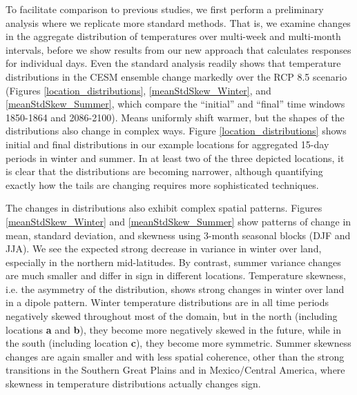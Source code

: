 \documentclass{ametsoc}
\begin{document}
To facilitate comparison to previous studies, we first perform a preliminary analysis where we replicate more standard methods. That is, we examine changes in the aggregate distribution of temperatures over multi-week and multi-month intervals, before we show results from our new approach that calculates responses for individual days. Even the standard analysis readily shows that temperature distributions in the CESM ensemble change markedly over the RCP 8.5 scenario (Figures \ref{location_distributions}, \ref{meanStdSkew_Winter}, and \ref{meanStdSkew_Summer}, which compare the “initial” and “final” time windows 1850-1864 and 2086-2100). Means uniformly shift warmer, but the shapes of the distributions also change in complex ways. Figure \ref{location_distributions} shows initial and final distributions in our example locations for aggregated 15-day periods in winter and summer. In at least two of the three depicted locations, it is clear that the distributions are becoming narrower, although quantifying exactly how the tails are changing requires more sophisticated techniques.

The changes in distributions also exhibit complex spatial patterns. Figures \ref{meanStdSkew_Winter} and \ref{meanStdSkew_Summer} show patterns of change in mean, standard deviation, and skewness using 3-month seasonal blocks (DJF and JJA). We see the expected strong decrease in variance in winter over land, especially in the northern mid-latitudes. By contrast, summer variance changes are much smaller and differ in sign in different locations. Temperature skewness, i.e. the asymmetry of the distribution, shows strong changes in winter over land in a dipole pattern. Winter temperature distributions are in all time periods negatively skewed throughout most of the domain, but in the north (including locations \textbf{a} and \textbf{b}), they become more negatively skewed in the future, while in the south (including location \textbf{c}), they become more symmetric.  Summer skewness changes are again smaller and with less spatial coherence, other than the strong transitions in the Southern Great Plains and in Mexico/Central America, where 
skewness in temperature distributions actually changes sign. 
 
\end{document}

